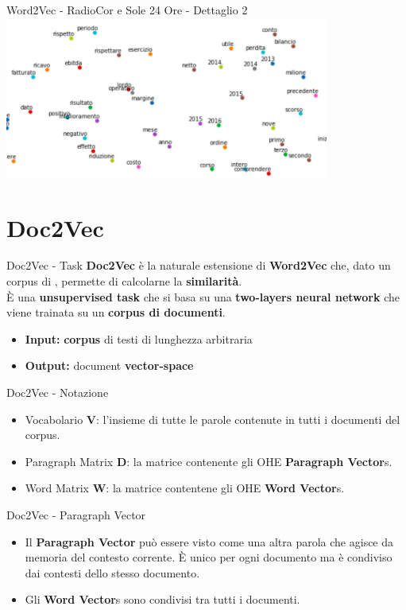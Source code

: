\documentclass[british]{beamer}
\begin{document}
\begin{frame}{Word2Vec - RadioCor e Sole 24 Ore - Dettaglio 2}
	\includegraphics[width= 0.8\textwidth]{./Imgs/plot-anni.png}
\end{frame}

\section{Doc2Vec}

\begin{frame}{Doc2Vec - Task}
	\textbf{Doc2Vec} \`{e} la naturale estensione di \textbf{Word2Vec} che, dato un corpus di , permette di calcolarne la \textbf{similarit\`{a}}.\\
	\`{E} una \textbf{unsupervised task} che si basa su una \textbf{\alert{two-layers neural network}} che viene trainata su un \textbf{corpus di documenti}. 
	\begin{itemize}
		\item \textbf{Input: }\textbf{corpus} di testi di lunghezza arbitraria
		\item \textbf{Output: }document \textbf{vector-space}
	\end{itemize}		
\end{frame}

\begin{frame}{Doc2Vec - Notazione}
	\begin{itemize}
		\item Vocabolario \textbf{V}: l'insieme di tutte le parole contenute in tutti i documenti del corpus.
		\item Paragraph Matrix \textbf{D}: la matrice contenente gli OHE \textbf{Paragraph Vector}s.
		\item Word Matrix \textbf{W}: la matrice contentene gli OHE \textbf{Word Vector}s.
	\end{itemize}
\end{frame}

\begin{frame}{Doc2Vec - Paragraph Vector}
	\begin{itemize}
		\item Il \textbf{Paragraph Vector} pu\`{o} essere visto come una altra parola che agisce da memoria del contesto corrente.
		 \`{E} unico per ogni documento ma \`{e} condiviso dai contesti dello stesso documento.
		\item Gli \textbf{Word Vector}s sono condivisi tra tutti i documenti.
	\end{itemize}
\end{frame}
\end{document}
